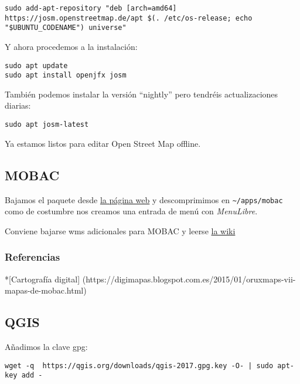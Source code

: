 \documentclass[
  12pt,
  spanish,
]{article}
\begin{document}
\begin{verbatim}
sudo add-apt-repository "deb [arch=amd64] https://josm.openstreetmap.de/apt $(. /etc/os-release; echo "$UBUNTU_CODENAME") universe"
\end{verbatim}

Y ahora procedemos a la instalación:

\begin{verbatim}
sudo apt update
sudo apt install openjfx josm 
\end{verbatim}

También podemos instalar la versión ``nightly'' pero tendréis
actualizaciones diarias:

\begin{verbatim}
sudo apt josm-latest
\end{verbatim}

Ya estamos listos para editar Open Street Map offline.

\hypertarget{mobac}{%
\subsection{MOBAC}\label{mobac}}

Bajamos el paquete desde \href{http://mobac.sourceforge.net/}{la página
web} y descomprimimos en \texttt{\textasciitilde{}/apps/mobac} como de
costumbre nos creamos una entrada de menú con \emph{MenuLibre}.

Conviene bajarse wms adicionales para MOBAC y leerse
\href{http://mobac.sourceforge.net/wiki/index.php/Custom_XML_Map_Sources}{la
wiki}

\hypertarget{referencias-1}{%
\subsubsection{Referencias}\label{referencias-1}}

*{[}Cartografía digital{]}
(https://digimapas.blogspot.com.es/2015/01/oruxmaps-vii-mapas-de-mobac.html)

\hypertarget{qgis}{%
\subsection{QGIS}\label{qgis}}

Añadimos la clave gpg:

\begin{verbatim}
wget -q  https://qgis.org/downloads/qgis-2017.gpg.key -O- | sudo apt-key add -
\end{verbatim}
\end{document}
